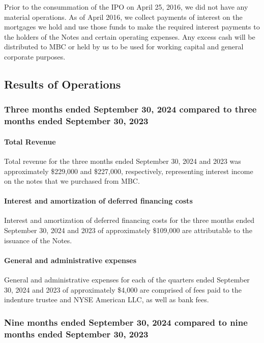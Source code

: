 \documentclass{article}
\begin{document}
Prior to the consummation of the IPO on April 25, 2016, we did not have any material operations. As of April 2016, we collect payments of interest on the mortgages we hold and use those funds to make the required interest payments to the holders of the Notes and certain operating expenses. Any excess cash will be distributed to MBC or held by us to be used for working capital and general corporate purposes.




\subsection*{Results of Operations}
\subsubsection*{Three months ended September 30, 2024 compared to three months ended September 30, 2023}



\paragraph{Total Revenue}

Total revenue for the three months ended September 30, 2024 and 2023 was approximately \$229,000 and \$227,000, respectively, representing interest income on the notes that we purchased from MBC.

\paragraph{Interest and amortization of deferred financing costs}

Interest and amortization of deferred financing costs for the three months ended September 30, 2024 and 2023 of approximately \$109,000 are attributable to the issuance of the Notes.

\paragraph{General and administrative expenses}

General and administrative expenses for each of the quarters ended September 30, 2024 and 2023 of approximately \$4,000 are comprised of fees paid to the indenture trustee and NYSE American LLC, as well as bank fees.



\subsubsection{Nine months ended September 30, 2024 compared to nine months ended September 30, 2023}
\end{document}
